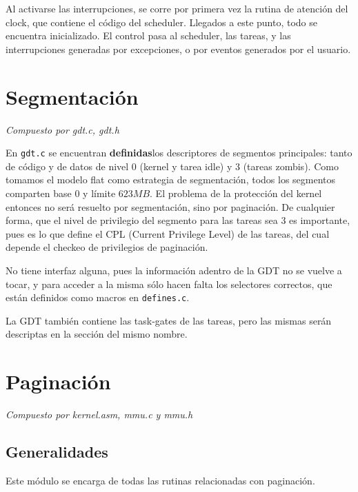 \documentclass{article}
\begin{document}
	Al activarse las interrupciones, se corre por primera vez la rutina de atención del clock, que contiene el código del scheduler. Llegados a este punto, todo se encuentra inicializado. El control pasa al scheduler, las tareas, y las interrupciones generadas por excepciones, o por eventos generados por el usuario.

	\section{Segmentación}
	\vspace{-1cm}	
	\begin{flushright}
	\textit{Compuesto por gdt.c, gdt.h}
	\end{flushright}
	
	En \texttt{gdt.c} se encuentran \textbf{definidas}los descriptores de segmentos principales: tanto de código y de datos de nivel 0 (kernel y tarea idle) y 3 (tareas zombis). Como tomamos el modelo flat como estrategia de segmentación, todos los segmentos comparten base $0$ y límite $623MB$. El problema de la protección del kernel entonces no será resuelto por segmentación, sino por paginación. De cualquier forma, que el nivel de privilegio del segmento para las tareas sea 3 es importante, pues es lo que define el CPL (Current Privilege Level) de las tareas, del cual depende el checkeo de privilegios de paginación.
	
	No tiene interfaz alguna, pues la información adentro de la GDT no se vuelve a tocar, y para acceder a la misma sólo hacen falta los selectores correctos, que están definidos como macros en \texttt{defines.c}.
	
	La GDT también contiene las task-gates de las tareas, pero las mismas serán descriptas en la sección del mismo nombre.
	
	\section{Paginación}
	\vspace{-1cm}	
	\begin{flushright}
	\textit{Compuesto por kernel.asm, mmu.c y mmu.h}
	\end{flushright}

	\subsection{Generalidades}
	
	Este módulo se encarga de todas las rutinas relacionadas con paginación.
	
\end{document}
